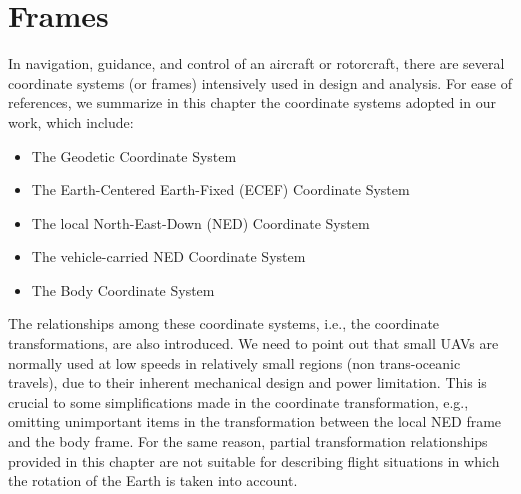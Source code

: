 \chapter{Frames}\label{ch:frames}

In navigation, guidance, and control of an aircraft or rotorcraft, there are several
coordinate systems (or frames) intensively used in design and analysis. For ease of references, we summarize in this chapter the coordinate systems
adopted in our work, which include:

\begin{itemize}
\item{The Geodetic Coordinate System}
\item{The Earth-Centered Earth-Fixed (ECEF) Coordinate System}
\item{The local North-East-Down (NED) Coordinate System}
\item{The vehicle-carried NED Coordinate System}
\item{The Body Coordinate System}
\end{itemize}

The relationships among these coordinate systems, i.e., the coordinate transformations, are also introduced. We need to point out that small UAVs are normally used at low speeds in relatively small regions (non trans-oceanic travels), due to their inherent mechanical design and power limitation. This is crucial to some simplifications made in the coordinate transformation, e.g., omitting unimportant items in the transformation between the local NED frame and the body frame. For the same reason, partial transformation relationships provided in this chapter are not suitable for describing flight situations in which the rotation of the Earth is taken into account.